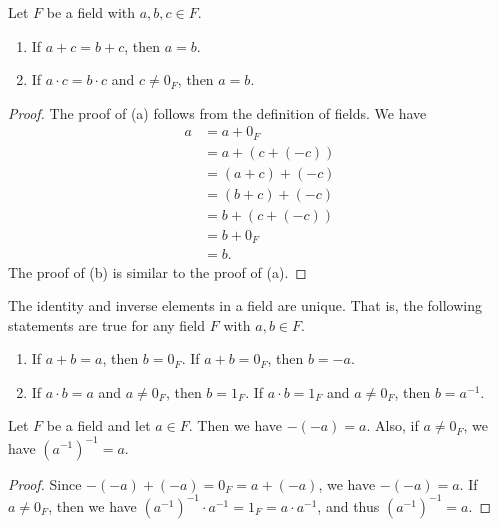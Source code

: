 \begin{theorem}
  \label{thm:cancellation-law}
  Let $F$ be a field with $a, b, c \in F$.
  \begin{enumerate}
    \item If $a + c = b + c$, then $a = b$.
    \item If $a \cdot c = b \cdot c$ and $c \neq 0_F$, then $a = b$.
  \end{enumerate}
\end{theorem}
\begin{proof}
  The proof of (a) follows from the definition of fields.
  We have
  \begin{align*}
    a
    &= a + 0_F \\
    &= a + (c + (-c)) \\
    &= (a + c) + (-c) \\
    &= (b + c) + (-c) \\
    &= b + (c + (-c)) \\
    &= b + 0_F \\
    &= b.      
  \end{align*}
  The proof of (b) is similar to the proof of (a).
\end{proof}

\begin{corollary}
  The identity and inverse elements in a field are unique.
  That is, the following statements are true for any field $F$ with
  $a, b \in F$.
  \begin{enumerate}
    \item If $a + b = a$, then $b = 0_F$.
    If $a + b = 0_F$, then $b = -a$.
    \item If $a \cdot b = a$ and $a \neq 0_F$, then $b = 1_F$.
    If $a \cdot b = 1_F$ and $a \neq 0_F$, then $b = a^{-1}$.
  \end{enumerate}
\end{corollary}

\begin{theorem}
  Let $F$ be a field and let $a \in F$.
  Then we have $-(-a) = a$.
  Also, if $a \neq 0_F$, we have $(a^{-1})^{-1} = a$.
\end{theorem}
\begin{proof}
  Since $-(-a) + (-a) = 0_F = a + (-a)$, we have $-(-a) = a$.
  If $a \neq 0_F$, then we have $(a^{-1})^{-1} \cdot a^{-1} = 1_F = a \cdot
  a^{-1}$, and thus $(a^{-1})^{-1} = a$.
\end{proof}

